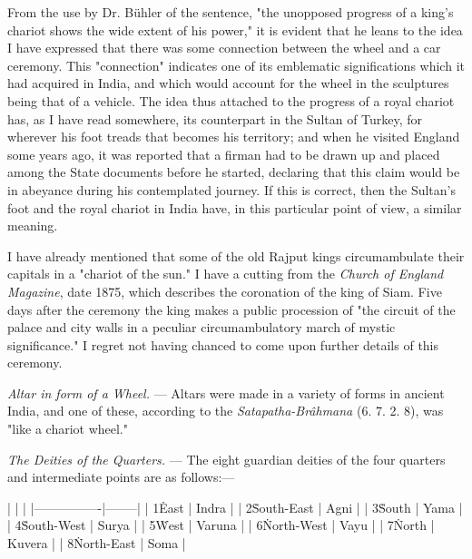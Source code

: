 \documentclass[a4paper, 11pt, oneside, polutonikogreek, english]{article}
\begin{document}
From the use by Dr. Bühler of the sentence, "the unopposed progress of a king's chariot shows the wide extent of his power," it is evident that he leans to the idea I have expressed that there was some connection between the wheel and a car ceremony. This "connection" indicates one of its emblematic significations which it had acquired in India, and which would account for the wheel in the sculptures being that of a vehicle. The idea thus attached to the progress of a royal chariot has, as I have read somewhere, its counterpart in the Sultan of Turkey, for wherever his foot treads that becomes his territory; and when he visited England some years ago, it was reported that a firman had to be drawn up and placed among the State documents before he started, declaring that this claim would be in abeyance during his contemplated journey. If this is correct, then the Sultan's foot and the royal chariot in India have, in this particular point of view, a similar meaning.

I have already mentioned that some of the old Rajput kings circumambulate their capitals in a "chariot of the sun." I have a cutting from the \emph{Church of England Magazine}, date 1875, which describes the coronation of the king of Siam. Five days after the ceremony the king makes a public procession of "the circuit of the palace and city walls in a peculiar circumambulatory march of mystic significance." I regret not having chanced to come upon further details of this ceremony.

\emph{Altar in form of a Wheel.} --- Altars were made in a variety of forms in ancient India, and one of these, according to the \emph{Satapatha-Brâhmana} (6. 7. 2. 8), was "like a chariot wheel."

\emph{The Deities of the Quarters.} --- The eight guardian deities of the four quarters and intermediate points are as follows:---

|                |        |
|----------------|--------|
| 1\. East       | Indra  |
| 2\. South-East | Agni   |
| 3\. South      | Yama   |
| 4\. South-West | Surya  |
| 5\. West       | Varuna |
| 6\. North-West | Vayu   |
| 7\. North      | Kuvera |
| 8\. North-East | Soma   |
\end{document}
